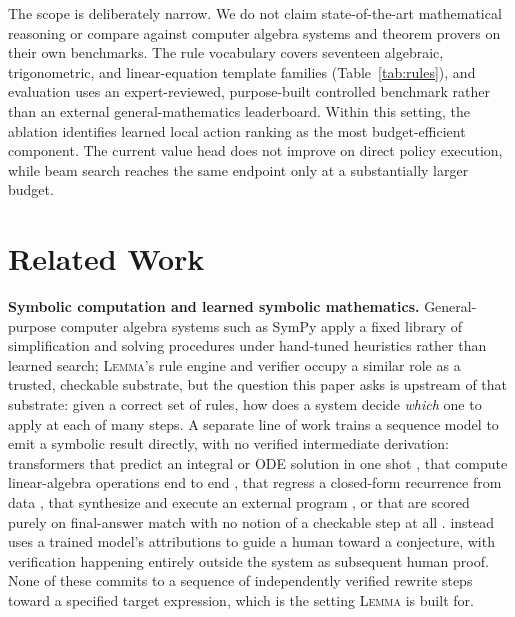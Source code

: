 \documentclass[11pt]{article}
\numberwithin{equation}{section}
\newcommand{\lemma}{\textsc{Lemma}}
\begin{document}
The scope is deliberately narrow. We do not claim state-of-the-art mathematical reasoning or compare against computer algebra systems and theorem provers on their own benchmarks. The rule vocabulary covers seventeen algebraic, trigonometric, and linear-equation template families (Table~\ref{tab:rules}), and evaluation uses an expert-reviewed, purpose-built controlled benchmark rather than an external general-mathematics leaderboard. Within this setting, the ablation identifies learned local action ranking as the most budget-efficient component. The current value head does not improve on direct policy execution, while beam search reaches the same endpoint only at a substantially larger budget.

\section{Related Work}

\textbf{Symbolic computation and learned symbolic mathematics.} General-purpose computer algebra systems such as SymPy \citep{sympy2017} apply a fixed library of simplification and solving procedures under hand-tuned heuristics rather than learned search; \lemma{}'s rule engine and verifier occupy a similar role as a trusted, checkable substrate, but the question this paper asks is upstream of that substrate: given a correct set of rules, how does a system decide \emph{which} one to apply at each of many steps. A separate line of work trains a sequence model to emit a symbolic result directly, with no verified intermediate derivation: transformers that predict an integral or ODE solution in one shot \citep{lample2020symbolic}, that compute linear-algebra operations end to end \citep{charton2022linear}, that regress a closed-form recurrence from data \citep{dascoli2022symbolic}, that synthesize and execute an external program \citep{drori2022neural}, or that are scored purely on final-answer match with no notion of a checkable step at all \citep{saxton2019mathematics}. \citet{davies2021advancing} instead uses a trained model's attributions to guide a human toward a conjecture, with verification happening entirely outside the system as subsequent human proof. None of these commits to a sequence of independently verified rewrite steps toward a specified target expression, which is the setting \lemma{} is built for.
\end{document}
